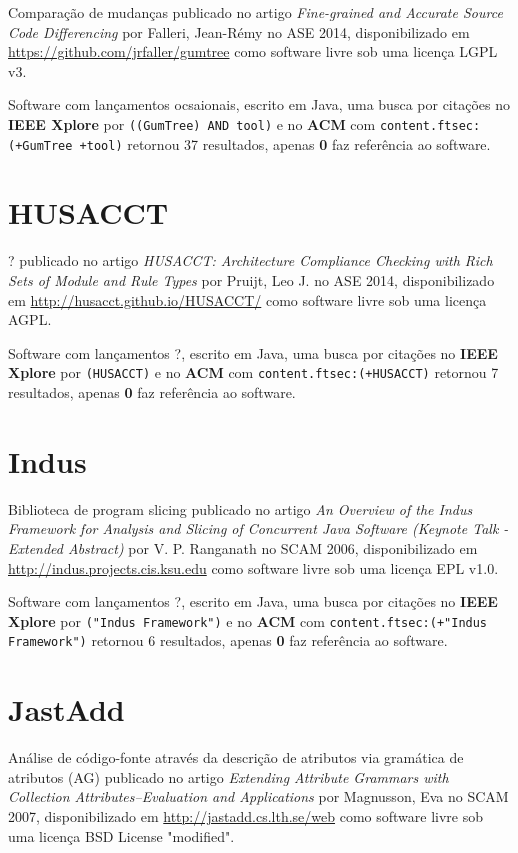 Comparação de mudanças
publicado no artigo {\it Fine-grained and Accurate Source Code Differencing}
por Falleri, Jean-R{\'e}my
no ASE 2014,
disponibilizado em \url{https://github.com/jrfaller/gumtree}
como software livre
sob uma licença LGPL v3.

Software com lançamentos ocsaionais,
escrito em Java,
uma busca por citações no {\bf IEEE Xplore} por
\texttt{((GumTree) AND tool)}
e no {\bf ACM} com
\texttt{content.ftsec:(+GumTree +tool)}
retornou
37 resultados, apenas
{\bf 0} faz referência ao software.



\section{HUSACCT}

?
publicado no artigo {\it HUSACCT: Architecture Compliance Checking with Rich Sets of Module and Rule Types}
por Pruijt, Leo J.
no ASE 2014,
disponibilizado em \url{http://husacct.github.io/HUSACCT/}
como software livre
sob uma licença AGPL.

Software com lançamentos ?,
escrito em Java,
uma busca por citações no {\bf IEEE Xplore} por
\texttt{(HUSACCT)}
e no {\bf ACM} com
\texttt{content.ftsec:(+HUSACCT)}
retornou
7 resultados, apenas
{\bf 0} faz referência ao software.



\section{Indus}

Biblioteca de program slicing
publicado no artigo {\it An Overview of the Indus Framework for Analysis and Slicing of Concurrent Java Software (Keynote Talk - Extended Abstract)}
por V. P. Ranganath
no SCAM 2006,
disponibilizado em \url{http://indus.projects.cis.ksu.edu}
como software livre
sob uma licença EPL v1.0.

Software com lançamentos ?,
escrito em Java,
uma busca por citações no {\bf IEEE Xplore} por
\texttt{("Indus Framework")}
e no {\bf ACM} com
\texttt{content.ftsec:(+"Indus Framework")}
retornou
6 resultados, apenas
{\bf 0} faz referência ao software.



\section{JastAdd}

Análise de código-fonte através da descrição de atributos via gramática de atributos (AG)
publicado no artigo {\it Extending Attribute Grammars with Collection Attributes--Evaluation and Applications}
por Magnusson, Eva
no SCAM 2007,
disponibilizado em \url{http://jastadd.cs.lth.se/web}
como software livre
sob uma licença BSD License "modified".

